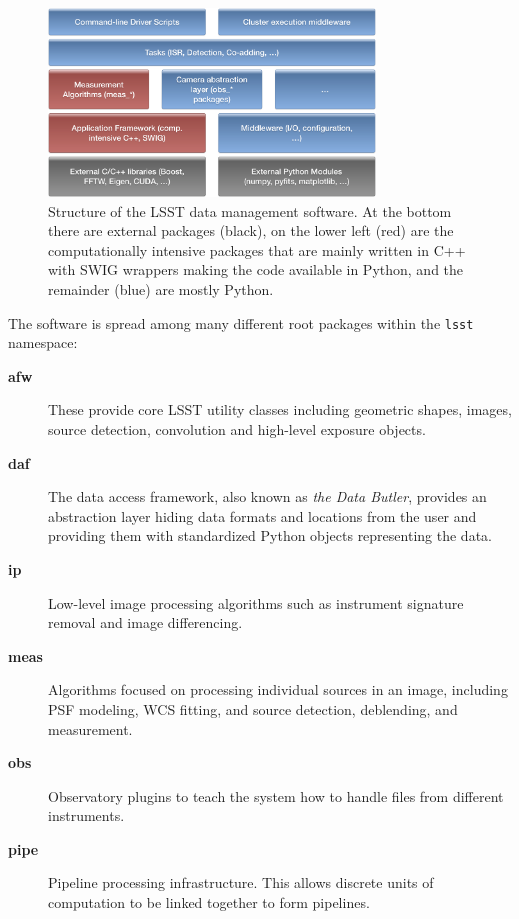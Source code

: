 \documentclass[]{spie}  %
\begin{document}
\begin{figure} [t]
\begin{center}
\includegraphics[height=5cm]{Software-Layers}
\end{center}
\caption[layers]
{\label{fig:layers}
Structure of the LSST data management software.
At the bottom there are external packages (black), on the lower left (red) are the computationally intensive packages that are mainly written in C++ with SWIG wrappers making the code available in Python, and the remainder (blue) are mostly Python.}
\end{figure}

The software is spread among many different root packages within the \texttt{lsst} namespace:

\begin{description}
\item[\textbf{afw}] These provide core LSST utility classes including geometric shapes, images, source detection, convolution and high-level exposure objects.

\item[\textbf{daf}] The data access framework, also known as \emph{the Data Butler}, provides an abstraction layer hiding data formats and locations from the user and providing them with standardized Python objects representing the data.

\item[\textbf{ip}] Low-level image processing algorithms such as instrument signature removal and image differencing.

\item[\textbf{meas}] Algorithms focused on processing individual sources in an image, including PSF modeling, WCS fitting, and source detection, deblending, and measurement.

\item[\textbf{obs}] Observatory plugins to teach the system how to handle files from different instruments.

\item[\textbf{pipe}] Pipeline processing infrastructure. This allows discrete units of computation to be linked together to form pipelines.

\end{description}
\end{document}

